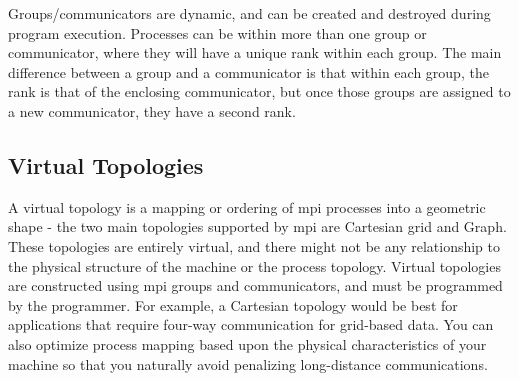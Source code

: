 \documentclass[10pt]{article}
\begin{document}
\begin{flushleft}
Groups/communicators are dynamic, and can be created and destroyed during program execution. Processes can be within more than one group or communicator, where they will have a unique rank within each group. The main difference between a group and a communicator is that within each group, the rank is that of the enclosing communicator, but once those groups are assigned to a new communicator, they have a second rank. 

\subsection{Virtual Topologies}

A virtual topology is a mapping or ordering of \gls{mpi} processes into a geometric shape - the two main topologies supported by \gls{mpi} are Cartesian grid and Graph. These topologies are entirely virtual, and there might not be any relationship to the physical structure of the machine or the process topology. Virtual topologies are constructed using \gls{mpi} groups and communicators, and must be programmed by the programmer. For example, a Cartesian topology would be best for applications that require four-way communication for grid-based data. You can also optimize process mapping based upon the physical characteristics of your machine so that you naturally avoid penalizing long-distance communications. 

\end{flushleft}
\end{document}
